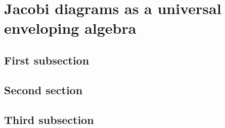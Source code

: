 \chapter{Jacobi diagrams as a universal enveloping algebra}
\label{ch:jacobi-diagrams-as-a-universal-enveloping-algebra}

\section{First subsection}

\section{Second section}

\section{Third subsection}

